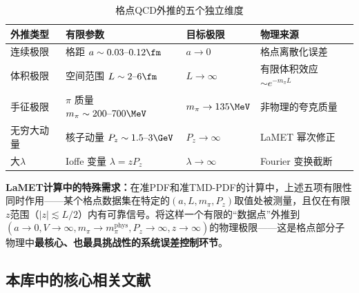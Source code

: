 \documentclass[12pt,a4paper]{ctexart}
\theoremstyle{definition}
\begin{document}
\begin{table}[H]
\centering
\caption{格点QCD外推的五个独立维度}
\label{tab:five_extrap}
\begin{tabular}{p{2cm}p{3.5cm}p{3cm}p{4cm}}
\toprule
\textbf{外推类型} & \textbf{有限参数} & \textbf{目标极限} & \textbf{物理来源} \\
\midrule
连续极限 & 格距 $a \sim 0.03\text{--}0.12\fm$ & $a \to 0$ & 格点离散化误差 \\
体积极限 & 空间范围 $L \sim 2\text{--}6\fm$ & $L \to \infty$ & 有限体积效应 $\sim e^{-m_\pi L}$ \\
手征极限 & $\pi$ 质量 $m_\pi \sim 200\text{--}700\MeV$ & $m_\pi \to 135\MeV$ & 非物理的夸克质量 \\
无穷大动量 & 核子动量 $P_z \sim 1.5\text{--}3\GeV$ & $P_z \to \infty$ & LaMET 幂次修正 \\
大$\lambda$ & Ioffe 变量 $\lambda = zP_z$ & $\lambda \to \infty$ & Fourier 变换截断 \\
\bottomrule
\end{tabular}
\end{table}

\textbf{LaMET计算中的特殊需求：}在准PDF和准TMD-PDF的计算中，上述五项有限性同时作用——某个格点数据集在特定的$(a, L, m_\pi, P_z)$取值处被测量，且仅在有限$z$范围（$|z| \lesssim L/2$）内有可靠信号。将这样一个有限的``数据点''外推到$(a\to0, V\to\infty, m_\pi\to m_\pi^{\text{phys}}, P_z\to\infty, z\to\infty)$的物理极限——这是格点部分子物理中\textbf{最核心、也最具挑战性的系统误差控制环节}。

\subsection{本库中的核心相关文献}
\end{document}
